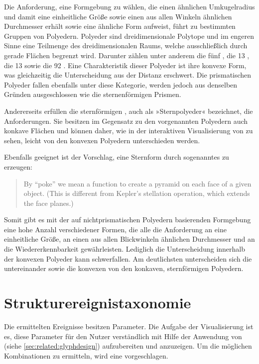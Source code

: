 Die Anforderung, eine Formgebung zu wählen, die einen ähnlichen Umkugelradius und damit eine einheitliche Größe sowie einen aus allen Winkeln ähnlichen Durchmesser erhält sowie eine ähnliche Form aufweist, führt zu bestimmten Gruppen von Polyedern. Polyeder sind dreidimensionale Polytope und im engeren Sinne eine Teilmenge des dreidimensionalen Raums, welche ausschließlich durch gerade Flächen begrenzt wird. Darunter zählen unter anderem die fünf  \cite{RegularPolyhedra}, die 13 , die 13  sowie die 92  \cite{JohnsonPolyeder}. Eine Charakteristik dieser Polyeder ist ihre konvexe Form, was gleichzeitig die Unterscheidung aus der Distanz erschwert. Die prismatischen Polyeder fallen ebenfalls unter diese Kategorie, werden jedoch aus denselben Gründen ausgeschlossen wie die sternenförmigen Prismen.

Andererseits erfüllen die sternförmigen , auch als »Sternpolyeder« bezeichnet, die Anforderungen. Sie besitzen im Gegensatz zu den vorgenannten Polyedern auch konkave Flächen \cite{KeplerPoinsotSolid} und können daher, wie in der interaktiven Visualisierung von \cite{WebGLUniformPolyhedra} zu sehen, leicht von den konvexen Polyedern unterschieden werden.

Ebenfalls geeignet ist der Vorschlag, eine Sternform durch sogenanntes  zu erzeugen: \blockcquote[4]{ProceduralGenerationofSculpturalForms}{By “poke” we mean a function to create a pyramid on each face of a given object. (This is different from Kepler’s stellation operation, which extends the face planes.)}

Somit gibt es mit der auf nichtprismatischen Polyedern basierenden Formgebung eine hohe Anzahl verschiedener Formen, die alle die Anforderung an eine einheitliche Größe, an einen aus allen Blickwinkeln ähnlichen Durchmesser und an die Wiedererkennbarkeit gewährleisten. Lediglich die Unterscheidung innerhalb der konvexen Polyeder kann schwerfallen. Am deutlichsten unterscheiden sich die  untereinander sowie die konvexen von den konkaven, sternförmigen Polyedern.


\section{Strukturereignistaxonomie}\label{sec:strukturereignistaxonomie}
Die ermittelten Ereignisse besitzen Parameter. Die Aufgabe der Visualisierung ist es, diese Parameter für den Nutzer verständlich mit Hilfe der Anwendung von  (siehe \autoref{sec:related:glyphdesign}) aufzubereiten und anzuzeigen. Um die möglichen Kombinationen zu ermitteln, wird eine  vorgeschlagen.

